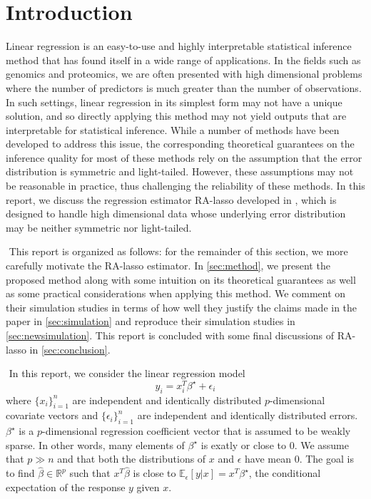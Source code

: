

\section{Introduction}
Linear regression is an easy-to-use and highly interpretable statistical inference method that has found itself in a wide range of applications. In the fields such as genomics and proteomics, we are often presented with high dimensional problems where the number of predictors is much greater than the number of observations. In such settings, linear regression in its simplest form may not have a unique solution, and so directly applying this method may not yield outputs that are interpretable for statistical inference. While a number of methods have been developed to address this issue, the corresponding theoretical guarantees on the inference quality for most of these methods rely on the assumption that the error distribution is symmetric and light-tailed. However, these assumptions may not be reasonable in practice, thus challenging the reliability of these methods. In this report, we discuss the regression estimator RA-lasso developed in \citet{fan2017estimation}, which is designed to handle high dimensional data whose underlying error distribution may be neither symmetric nor light-tailed.

$ $\newline
This report is organized as follows: for the remainder of this section, we more carefully motivate the RA-lasso estimator. In \cref{sec:method}, we present the proposed method along with some intuition on its theoretical guarantees as well as some practical considerations when applying this method. We comment on their simulation studies in terms of how well they justify the claims made in the paper in \cref{sec:simulation} and reproduce their simulation studies in \cref{sec:newsimulation}. This report is concluded with some final discussions of RA-lasso in \cref{sec:conclusion}.

$ $\newline
In this report, we consider the linear regression model
\[
y_i = x_i^T\beta^\star + \epsilon_i
\]
where $\{x_i\}_{i=1}^n$ are independent and identically distributed $p$-dimensional covariate vectors and $\{\epsilon_i\}_{i=1}^n$ are independent and identically distributed errors. $\beta^\star$ is a $p$-dimensional regression coefficient vector that is assumed to be weakly sparse. In other words, many elements of $\beta^\star$ is exatly or close to $0$. We assume that $p \gg n$ and that both the distributions of $x$ and $\epsilon$ have mean $0$. The goal is to find $\hat{\beta}\in\mathbb{R}^p$ such that $x^T\hat{\beta}$ is close to $\mathbb{E}_{\epsilon}\left[ y | x \right] = x^T\beta^\star$, the conditional expectation of the response $y$ given $x$.

